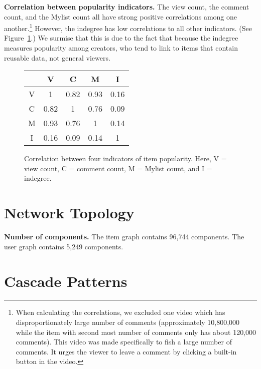 \documentclass[10pt, a4paper]{article}
\begin{document}
{\bf Correlation between popularity indicators.} The view count, the comment count, and the Mylist count all have strong positive correlations among one another.\footnote{When calculating the correlations, we excluded one video which has disproportionately large number of comments (approximately 10,800,000 while the item with second most number of comments only has about 120,000 comments). This video was made specifically to fish a large number of comments. It urges the viewer to leave a comment by clicking a built-in button in the video.} However, the indegree has low correlations to all other indicators. (See Figure~\ref{correlation-table}.) We surmise that this is due to the fact that because the indegree measures popularity among creators, who tend to link to items that contain reusable data, not general viewers.
\begin{figure}
	\centering
	\begin{tabular}{c|c|c|c|c}
		& V & C & M & I \\
		\hline
		V & 1 & 0.82 & 0.93 & 0.16 \\
		\hline
		C & 0.82 & 1 & 0.76 & 0.09 \\
		\hline
		M & 0.93 & 0.76 & 1 & 0.14 \\
		\hline
		I & 0.16 & 0.09 & 0.14 & 1 \\
	\end{tabular}
	\caption{Correlation between four indicators of item popularity. Here, V = view count, C = comment count, M = Mylist count, and I = indegree.}
	\label{correlation-table}
\end{figure}

\section{Network Topology}

{\bf Number of components.} The item graph contains 96,744 components. The user graph contains 5,249 components. \medskip

\section{Cascade Patterns}



  
\end{document}
